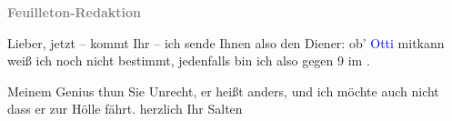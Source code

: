 \pstart
           \textcolor{gray}{\textbf{\textbf{Feuilleton-Redaktion}}}\pend
           
\pstart
           Lieber, jetzt – \label{K_L03404-1v}\label{K_L03404-1h} kommt Ihr \label{K_L03404-2v}\label{K_L03404-2h} – ich sende Ihnen also den Diener: ob’ \textcolor{blue}{Otti}{}\ledrightnote{\textcolor{blue}{Ottilie Salten}} mitkann weiß ich noch nicht bestimmt, jedenfalls bin ich also gegen
                  9 im \label{K_L03404-3v}\label{K_L03404-3h}.\pend
           
\pstart
           Meinem Genius thun Sie Unrecht, er heißt anders, und ich möchte auch nicht dass er
               zur Hölle fährt.\pend
           \pstart herzlich Ihr \spacefill\mbox{Salten}\pend{}\endnumbering{}  
      